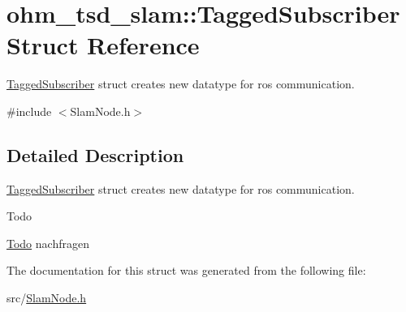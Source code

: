 \hypertarget{structohm__tsd__slam_1_1TaggedSubscriber}{\section{ohm\-\_\-tsd\-\_\-slam\-:\-:Tagged\-Subscriber Struct Reference}
\label{structohm__tsd__slam_1_1TaggedSubscriber}
}


\hyperlink{structohm__tsd__slam_1_1TaggedSubscriber}{Tagged\-Subscriber} struct creates new datatype for ros communication.  




{\ttfamily \#include $<$Slam\-Node.\-h$>$}



\subsection{Detailed Description}
\hyperlink{structohm__tsd__slam_1_1TaggedSubscriber}{Tagged\-Subscriber} struct creates new datatype for ros communication. 

\begin{DoxyRefDesc}{Todo}
\item[\hyperlink{todo__todo000002}{Todo}]nachfragen \end{DoxyRefDesc}


The documentation for this struct was generated from the following file\-:\begin{DoxyCompactItemize}
\item 
src/\hyperlink{SlamNode_8h}{Slam\-Node.\-h}\end{DoxyCompactItemize}
